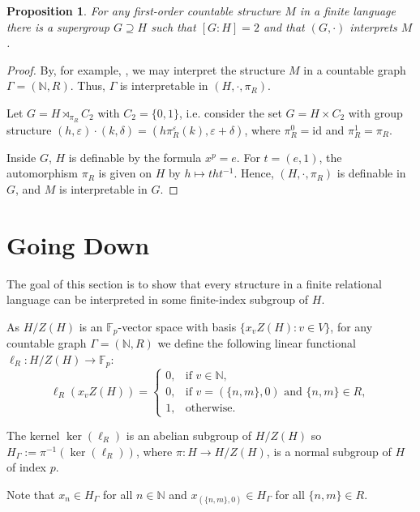 \documentclass[11pt]{amsart}
\theoremstyle{plain}
\newtheorem{proposition}[theorem]{Proposition}
\theoremstyle{definition}
\theoremstyle{remark}
\numberwithin{equation}{section}
\begin{document}
\begin{proposition}\label{P: up}
For any first-order countable structure $M$ in a finite  language there is  a supergroup $G\supseteq H$ such that $[G:H]=2$ and that $(G,\cdot)$ interprets $M$.
\end{proposition}
\begin{proof}
    By, for example, \cite[Theorem 5.5.1]{Hodges}, we may interpret the structure $M$ in a countable graph $\Gamma=(\mathbb{N},R)$. Thus, $\Gamma$ is interpretable in $(H,\cdot,\pi_R)$.

    Let $G=H\rtimes_{\pi_R} C_2$ with $C_2=\{0,1\}$, i.e. consider the set $G=H\times C_2$ with group structure $(h,\varepsilon)\cdot (k,\delta)=(h\pi_R^\varepsilon(k),\varepsilon+\delta)$, where $\pi_R^0=\mathrm{id}$ and $\pi_R^1=\pi_R$.

    Inside $G$, $H$ is definable by the formula $x^p=e$. For $t=(e,1)$, the automorphism $\pi_R$ is given on $H$ by $h\mapsto tht^{-1}$. Hence, $(H,\cdot,\pi_R)$ is definable in $G$, and $M$ is interpretable in $G$.
\end{proof}

\section{Going Down}

The goal of this section is to show that every structure in a finite relational language can be interpreted in some finite-index subgroup of $H$.

As $H/Z(H)$ is an $\mathbb{F}_p$-vector space with basis $\{x_vZ(H):v\in V\}$,  for any countable graph $\Gamma=(\mathbb{N},R)$ we define the following linear functional $\ell_R:H/Z(H)\to \mathbb{F}_p$:
\[
 \ell_R(x_vZ(H))=
 \begin{cases}
 0,&\text{if $v\in \mathbb{N}$},\\
 0,&\text{if $v=(\{n,m\},0)$ and $\{n,m\}\in R$},\\
 1,&\text{otherwise.}
 \end{cases}
\]

The kernel $\ker(\ell_R)$ is an abelian subgroup of $H/Z(H)$ so $H_\Gamma:=\pi^{-1}(\ker(\ell_R))$, where $\pi:H\to H/Z(H)$, is a normal subgroup of $H$ of index $p$.

Note that $x_n\in H_\Gamma$ for all $n\in \mathbb{N}$ and $x_{(\{n,m\},0)}\in H_\Gamma$ for all $\{n,m\}\in R$.
\end{document}
